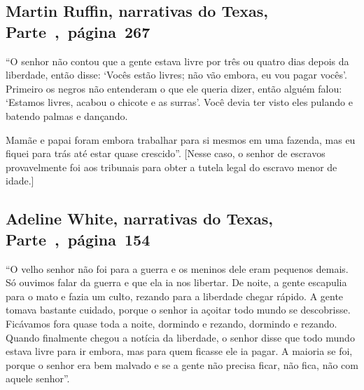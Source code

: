 \subsection{Martin Ruffin, narrativas do Texas, Parte~,~página~267}
\label{ref234}

``O senhor não contou que a gente estava livre por três ou quatro dias
depois da liberdade, então disse: `Vocês estão livres; não vão embora,
eu vou pagar vocês'. Primeiro os negros não entenderam o que ele queria
dizer, então alguém falou: `Estamos livres, acabou o chicote e as
surras'. Você devia ter visto eles pulando e batendo palmas e dançando.

Mamãe e papai foram embora trabalhar para si mesmos em uma fazenda, mas
eu fiquei para trás até estar quase crescido''. {[}Nesse caso, o senhor de
escravos provavelmente foi aos tribunais para obter a tutela legal do
escravo menor de idade.{]}

\subsection{Adeline White, narrativas do Texas, Parte~,~página~154}
\label{ref282}

``O velho senhor não foi para a guerra e os meninos dele eram pequenos
demais. Só ouvimos falar da guerra e que ela ia nos libertar. De noite,
a gente escapulia para o mato e fazia um culto, rezando para a liberdade
chegar rápido. A gente tomava bastante cuidado, porque o senhor ia
açoitar todo mundo se descobrisse. Ficávamos fora quase toda a noite,
dormindo e rezando, dormindo e rezando. Quando finalmente chegou a
notícia da liberdade, o senhor disse que todo mundo estava livre para ir
embora, mas para quem ficasse ele ia pagar. A maioria se foi, porque o
senhor era bem malvado e se a gente não precisa ficar, não fica, não com
aquele senhor''.

